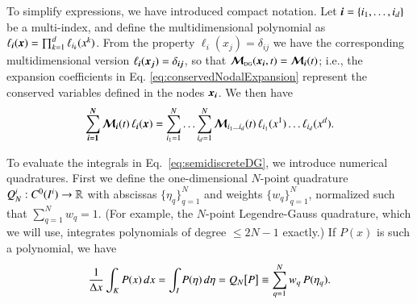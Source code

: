 \documentclass[11pt,letterpaper,twoside,english,final]{article}
\begin{document}
To simplify expressions, we have introduced compact notation.  
Let $\boldsymbol{i}=\{i_{1},\ldots,i_{d}\}$ be a multi-index, and define the multidimensional polynomial as $\ell_{\boldsymbol{i}}(\boldsymbol{x})=\prod_{k=1}^{d}\ell_{i_{k}}(x^{k})$.  
From the property $\ell_{i}(x_{j})=\delta_{ij}$ we have the corresponding multidimensional version $\ell_{\boldsymbol{i}}(\boldsymbol{x}_{\boldsymbol{j}})=\delta_{\boldsymbol{i}\boldsymbol{j}}$, so that $\boldsymbol{\mathcal{M}}_{\mbox{\tiny DG}}(\boldsymbol{x}_{\boldsymbol{i}},t)=\boldsymbol{\mathcal{M}}_{\boldsymbol{i}}(t)$; i.e., the expansion coefficients in Eq. \eqref{eq:conservedNodalExpansion} represent the conserved variables defined in the nodes $\boldsymbol{x}_{\boldsymbol{i}}$.  
We then have
\begin{equation}
  \sum_{\boldsymbol{i}=\boldsymbol{1}}^{\boldsymbol{N}}\boldsymbol{\mathcal{M}}_{\boldsymbol{i}}(t)\,\ell_{\boldsymbol{i}}(\boldsymbol{x})
  =\sum_{i_{1}=1}^{N}\ldots\sum_{i_{d}=1}^{N}\boldsymbol{\mathcal{M}}_{i_{1}\ldots i_{d}}(t)\,\ell_{i_{1}}(x^{1})\ldots\ell_{i_{d}}(x^{d}).  
\end{equation}

To evaluate the integrals in Eq.~\eqref{eq:semidiscreteDG}, we introduce numerical quadratures.  
First we define the one-dimensional $N$-point quadrature $Q_{N}^{i}:C^{0}(I^{i})\to\mathbb{R}$ with abscissas $\{\eta_{q}\}_{q=1}^{N}$ and weights $\{w_{q}\}_{q=1}^{N}$, normalized such that $\sum_{q=1}^{N}w_{q}=1$.  
(For example, the $N$-point Legendre-Gauss quadrature, which we will use, integrates polynomials of degree $\le 2N-1$ exactly.)
If $P(x)$ is such a polynomial, we have
\begin{equation}
  \frac{1}{\Delta x}\int_{K}P(x)\,dx=\int_{I}P(\eta)\,d\eta=Q_{N}\big[P\big]\equiv\sum_{q=1}^{N}w_{q}\,P(\eta_{q}).  
\end{equation}
\end{document}
